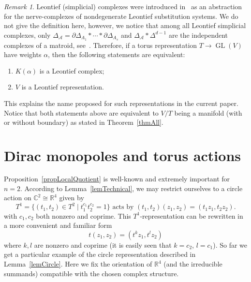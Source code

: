 \documentclass[english,12pt,oneside]{amsproc}
\DeclareMathOperator{\GL}{GL}
\newcommand{\Ro}{\mathbb{R}}
\newcommand{\Co}{\mathbb{C}}
\newcommand{\ca}[1]{\mathcal{#1}}
\newcommand{\dd}{\partial}
\newcounter{stmcounter}[section]
\numberwithin{equation}{section}
\theoremstyle{plain}
\theoremstyle{definition}
\theoremstyle{remark}
\newtheorem{rem}[stmcounter]{Remark}
\begin{document}
\begin{rem}
Leontief (simplicial) complexes were introduced in~\cite{BilProv} as an abstraction for the nerve-complexes of nondegenerate Leontief substitution systems. We do not give the definition here, however, we notice that among all Leontief simplicial complexes, only $\Delta_{\ca{A}}=\dd\Delta_{A_1}\ast\cdots\ast \dd\Delta_{A_s}$ and $\Delta_{\ca{A}}\ast\Delta^{d-1}$ are the independent complexes of a matroid, see~\cite[Thm.3.4]{BilProv}. Therefore, if a torus representation $T\to\GL(V)$ have weights $\alpha$, then the following statements are equivalent:
\begin{enumerate}
  \item $K(\alpha)$ is a Leontief complex;
  \item $V$ is a Leontief representation.
\end{enumerate}
This explains the name proposed for such representations in the current paper. Notice that both statements above are equivalent to $V/T$ being a manifold (with or without boundary) as stated in Theorem~\ref{thmAll}.
\end{rem}


\section{Dirac monopoles and torus actions}\label{secMonopoles}

Proposition~\ref{propLocalQuotient} is well-known and extremely important for $n=2$. According to Lemma~\ref{lemTechnical}, we may restrict ourselves to a circle action on $\Co^2\cong\Ro^4$ given by
\[
T^1=\{(t_1,t_2)\in T^2\mid t_1^{c_1}t_2^{c_2}=1\} \text{ acts by } (t_1,t_2)(z_1,z_2)=(t_1z_1,t_2z_2).
\]
with $c_1,c_2$ both nonzero and coprime. This $T^1$-representation can be rewritten in a more convenient and familiar form
\begin{equation}\label{eqDim2Hopf}
t(z_1,z_2)=(t^kz_1, t^lz_2)
\end{equation}
where $k,l$ are nonzero and coprime (it is easily seen that $k=c_2$, $l=c_1$). So far we get a particular example of the circle representation described in Lemma~\ref{lemCircle}. Here we fix the orientation of $\Ro^4$ (and the irreducible summands) compatible with the chosen complex structure.
\end{document}
